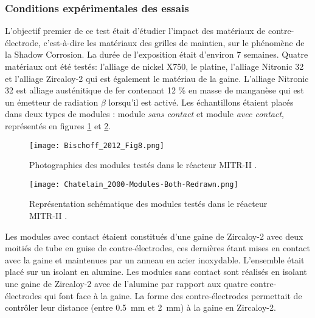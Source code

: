 \begin{refsection}
    \subsubsection{Conditions expérimentales des essais}
        L’objectif premier de ce test était d’étudier l’impact des matériaux de
        contre-électrode, c’est-à-dire les matériaux des grilles de maintien, sur le
        phénomène de la Shadow Corrosion. La durée de l'exposition était d'environ 7 semaines.
        Quatre matériaux ont été testés: l'alliage de
        nickel X750, le platine, l’alliage Nitronic 32 et l'alliage Zircaloy-2 qui est
        également le matériau de la gaine. L’alliage Nitronic 32 est alliage austénitique
        de fer contenant 12 \% en masse de manganèse qui est un émetteur de radiation $\beta$
        lorsqu’il est activé. Les échantillons étaient placés dans deux types de modules :
        module \emph{sans contact} et module \emph{avec contact}, représentés en figures
        \ref{fig:Modules_MIT_Test} et \ref{fig:Modules_MIT_Test_schematics}.

        \begin{figure}[H] 
            \centering 
            \texttt{[image: Bischoff\_2012\_Fig8.png]} 
            \caption[Photographies des modules testés dans le réacteur MITR-II.]
            {Photographies des modules testés dans le réacteur MITR-II \citep{Chatelain2000}.} 
            \label{fig:Modules_MIT_Test} 
        \end{figure}
        
        \begin{figure}[H] 
            \centering 
            \texttt{[image: Chatelain\_2000-Modules-Both-Redrawn.png]} 
            \caption[Représentation schématique des modules testés dans le réacteur MITR-II.]
            {Représentation schématique des modules testés dans le réacteur MITR-II \citep{Chatelain2000}.} 
            \label{fig:Modules_MIT_Test_schematics} 
        \end{figure}

        Les modules avec contact étaient constitués d’une gaine de Zircaloy-2 avec deux
        moitiés de tube en guise de contre-électrodes, ces dernières étant mises en contact
        avec la gaine et maintenues par un anneau en acier inoxydable. L’ensemble était
        placé sur un isolant en alumine. Les modules sans contact sont réalisés en
        isolant une gaine de Zircaloy-2 avec de l’alumine par rapport aux quatre contre-électrodes
        qui font face à la gaine. La forme des contre-électrodes permettait de
        contrôler leur distance (entre \SI{0.5}{\milli\meter} et \SI{2}{\milli\meter}) à la gaine en Zircaloy-2.


\end{refsection}
